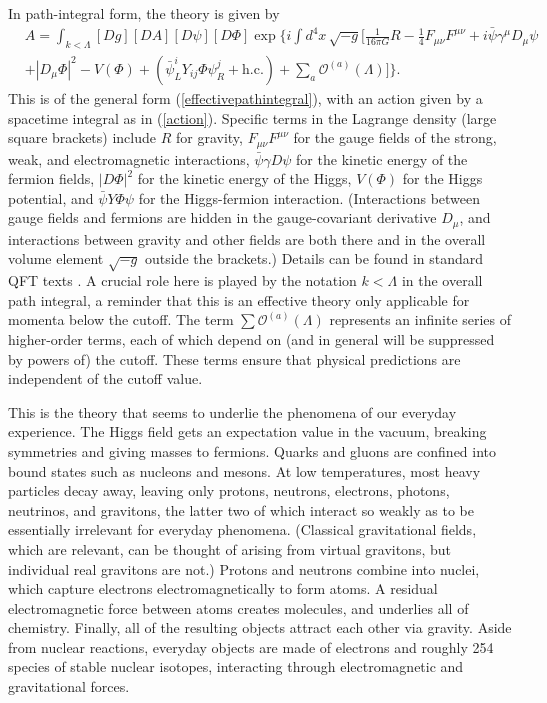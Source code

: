 \documentclass[12pt,letterpaper]{article}
\newcommand{\bea}{\begin{eqnarray}}
\newcommand{\eea}{\end{eqnarray}}
\begin{document}
In path-integral form, the theory is given by
\bea
&A = \displaystyle\int_{k < \Lambda} [Dg][DA][D\psi][D\Phi]\exp\bigg\{i \int d^4x\,\sqrt{-g}\bigg[\frac{1}{16\pi G}R - \frac{1}{4}F_{\mu\nu}F^{\mu\nu} 
+ i\bar\psi\gamma^\mu D_\mu \psi 
 \nonumber  \\&
+ |D_\mu\Phi|^2 -V(\Phi) + \left(\bar\psi^i_L Y_{ij}\Phi\psi^j_R + \mathrm{h.c.}\right) + \sum_a \mathcal{O}^{(a)}(\Lambda) \bigg]\bigg\}.
\label{coretheory}
\eea
This is of the general form (\ref{effectivepathintegral}), with an action given by a spacetime integral as in (\ref{action}).
Specific terms in the Lagrange density (large square brackets) include $R$ for gravity, $F_{\mu\nu}F^{\mu\nu}$ for the gauge fields of the strong, weak, and electromagnetic interactions, $\bar\psi \gamma D \psi$ for the kinetic energy of the fermion fields, $|D\Phi|^2$ for the kinetic energy of the Higgs, $V(\Phi)$ for the Higgs potential, and $\bar\psi Y\Phi\psi$ for the Higgs-fermion interaction.
(Interactions between gauge fields and fermions are hidden in the gauge-covariant derivative $D_\mu$, and interactions between gravity and other fields are both there and in the overall volume element $\sqrt{-g}$ outside the brackets.)
Details can be found in standard QFT texts \citep{peskin2015introduction}.
A crucial role here is played by the notation $k<\Lambda$ in the overall path integral, a reminder that this is an effective theory only applicable for momenta below the cutoff.
The term $\sum\mathcal{O}^{(a)}(\Lambda)$ represents an infinite series of higher-order terms, each of which depend on (and in general will be suppressed by powers of) the cutoff.
These terms ensure that physical predictions are independent of the cutoff value.

This is the theory that seems to underlie the phenomena of our everyday experience.
The Higgs field gets an expectation value in the vacuum, breaking symmetries and giving masses to fermions.
Quarks and gluons are confined into bound states such as nucleons and mesons.
At low temperatures, most heavy particles decay away, leaving only protons, neutrons, electrons, photons, neutrinos, and gravitons, the latter two of which interact so weakly as to be essentially irrelevant for everyday phenomena.
(Classical gravitational fields, which are relevant, can be thought of arising from virtual gravitons, but individual real gravitons are not.)
Protons and neutrons combine into nuclei, which capture electrons electromagnetically to form atoms.
A residual electromagnetic force between atoms creates molecules, and underlies all of chemistry.
Finally, all of the resulting objects attract each other via gravity.
Aside from nuclear reactions, everyday objects are made of electrons and roughly 254 species of stable nuclear isotopes, interacting through electromagnetic and gravitational forces.
\end{document}

